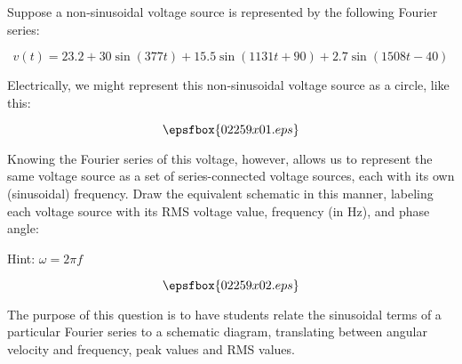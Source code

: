 

Suppose a non-sinusoidal voltage source is represented by the following Fourier series:

$$v(t) = 23.2 + 30 \sin (377 t) + 15.5 \sin (1131 t + 90) + 2.7 \sin (1508 t - 40)$$

Electrically, we might represent this non-sinusoidal voltage source as a circle, like this:

$$\epsfbox{02259x01.eps}$$

Knowing the Fourier series of this voltage, however, allows us to represent the same voltage source as a set of series-connected voltage sources, each with its own (sinusoidal) frequency.  Draw the equivalent schematic in this manner, labeling each voltage source with its RMS voltage value, frequency (in Hz), and phase angle:

\vskip 60pt

Hint: $\omega = 2 \pi f$

\vskip 10pt







$$\epsfbox{02259x02.eps}$$







The purpose of this question is to have students relate the sinusoidal terms of a particular Fourier series to a schematic diagram, translating between angular velocity and frequency, peak values and RMS values.




